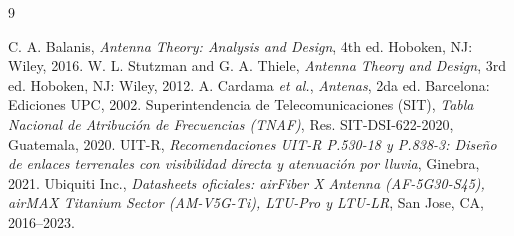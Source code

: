 \documentclass[10pt,letterpaper]{article}
\begin{document}
\begin{thebibliography}{9}
\footnotesize

\setlength{\itemsep}{1pt}

 C. A. Balanis, \textit{Antenna Theory: Analysis and Design}, 4th ed. Hoboken, NJ: Wiley, 2016.
 W. L. Stutzman and G. A. Thiele, \textit{Antenna Theory and Design}, 3rd ed. Hoboken, NJ: Wiley, 2012.
 A. Cardama \textit{et al.}, \textit{Antenas}, 2da ed. Barcelona: Ediciones UPC, 2002.
 Superintendencia de Telecomunicaciones (SIT), \textit{Tabla Nacional de Atribución de Frecuencias (TNAF)}, Res. SIT-DSI-622-2020, Guatemala, 2020.
 UIT-R, \textit{Recomendaciones UIT-R P.530-18 y P.838-3: Diseño de enlaces terrenales con visibilidad directa y atenuación por lluvia}, Ginebra, 2021.
 Ubiquiti Inc., \textit{Datasheets oficiales: airFiber X Antenna (AF-5G30-S45), airMAX Titanium Sector (AM-V5G-Ti), LTU-Pro y LTU-LR}, San Jose, CA, 2016--2023.
\end{thebibliography}
\end{document}

